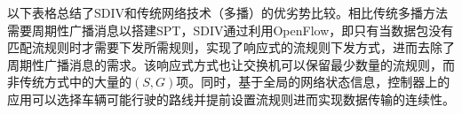 
以下表格总结了SDIV和传统网络技术（多播）的优劣势比较。相比传统多播方法需要周期性广播消息以搭建SPT，SDIV通过利用OpenFlow，即只有当数据包没有匹配流规则时才需要下发所需规则，实现了响应式的流规则下发方式，进而去除了周期性广播消息的需求。该响应式方式也让交换机可以保留最少数量的流规则，而非传统方式中的大量的$(S,G)$项。同时，基于全局的网络状态信息，控制器上的应用可以选择车辆可能行驶的路线并提前设置流规则进而实现数据传输的连续性。


